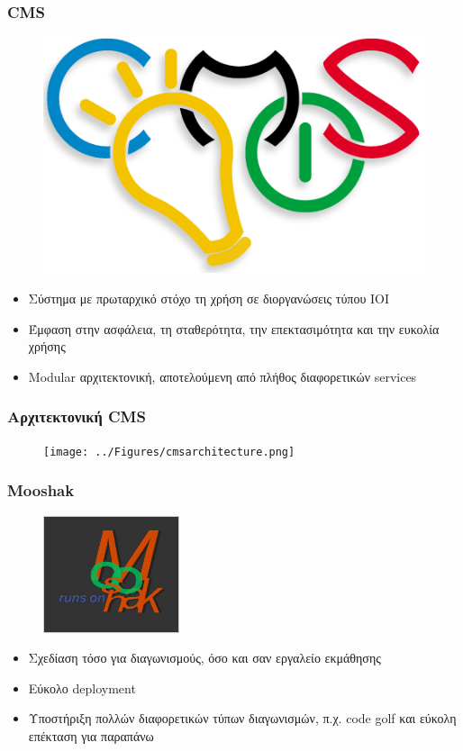 \documentclass{beamer}
\begin{document}
\begin{frame}
  \frametitle{CMS}

  \begin{figure}[t]
    \includegraphics[scale=0.1]{../Figures/cms.png}
  \end{figure}

  \begin{itemize}
      \item Σύστημα με πρωταρχικό στόχο τη χρήση σε διοργανώσεις τύπου IOI
      \item Έμφαση στην ασφάλεια, τη σταθερότητα, την επεκτασιμότητα και την ευκολία
        χρήσης
      \item Modular αρχιτεκτονική, αποτελούμενη από πλήθος διαφορετικών services
  \end{itemize}
\end{frame}

\begin{frame}
  \frametitle{Αρχιτεκτονική CMS}
  \begin{figure}
    \texttt{[image: ../Figures/cmsarchitecture.png]}
  \end{figure}
\end{frame}

\begin{frame}
  \frametitle{Mooshak}

  \begin{figure}
    \includegraphics[scale=0.5]{../Figures/mooshak.png}
  \end{figure}

  \begin{itemize}
      \item Σχεδίαση τόσο για διαγωνισμούς, όσο και σαν εργαλείο εκμάθησης
      \item Εύκολο deployment
      \item Υποστήριξη πολλών διαφορετικών τύπων διαγωνισμών, π.χ. code golf και
        εύκολη επέκταση για παραπάνω
  \end{itemize}
\end{frame}
\end{document}
